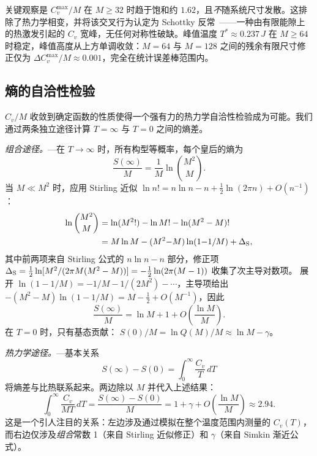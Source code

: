 \documentclass[aps, pre, reprint, amsmath, amssymb, superscriptaddress, floatfix]{revtex4-2}
\begin{document}
关键观察是 $C_v^{\max}/M$ 在 $M \ge 32$ 时趋于饱和约 $1.62$，且\emph{不}随系统尺寸发散。这排除了热力学相变，并将该交叉行为认定为 Schottky 反常~\cite{Binder1997}——一种由有限能隙上的热激发引起的 $C_v$ 宽峰，无任何对称性破缺。峰值温度 $T^* \approx 0.237\,J$ 在 $M \ge 64$ 时稳定，峰值高度从上方单调收敛：$M = 64$ 与 $M = 128$ 之间的残余有限尺寸修正仅为 $\Delta C_v^{\max}/M \approx 0.001$，完全在统计误差棒范围内。

\subsection{熵的自洽性检验}
\label{sec:entropy_check}

$C_v/M$ 收敛到确定函数的性质使得一个强有力的热力学自洽性检验成为可能。我们通过两条独立途径计算 $T = \infty$ 与 $T = 0$ 之间的熵差。

\textit{组合途径。}---在 $T \to \infty$ 时，所有构型等概率，每个皇后的熵为
\begin{equation}
  \frac{S(\infty)}{M}
  = \frac{1}{M}\ln\binom{M^2}{M}.
  \label{eq:Sinf_def}
\end{equation}
当 $M \ll M^2$ 时，应用 Stirling 近似
$\ln n! = n\ln n - n + \tfrac{1}{2}\ln(2\pi n) + O(n^{-1})$：
\begin{align}
  \ln\binom{M^2}{M}
  &= \ln(M^2!) - \ln M! - \ln(M^2 - M)! \notag\\
  &= M\ln M - (M^2{-}M)\ln(1{-}1/M)
  + \Delta_{\rm S},
  \label{eq:Sinf_stirling}
\end{align}
其中前两项来自 Stirling 公式的 $n\ln n - n$ 部分，修正项
$\Delta_{\rm S} = \tfrac{1}{2}\ln[M^2/(2\pi M(M^2-M))]
= -\tfrac{1}{2}\ln(2\pi(M-1))$ 收集了次主导对数项。
展开 $\ln(1 - 1/M) = -1/M - 1/(2M^2) - \cdots$，主导项给出 $-(M^2-M)\ln(1-1/M) = M - \tfrac{1}{2} + O(M^{-1})$，因此
\begin{equation}
  \frac{S(\infty)}{M}
  = \ln M + 1 + O\!\left(\frac{\ln M}{M}\right).
  \label{eq:Sinf}
\end{equation}
在 $T = 0$ 时，只有基态贡献：
$S(0)/M = \ln Q(M)/M \approx \ln M - \gamma$。

\textit{热力学途径。}---基本关系
\begin{equation}
  S(\infty) - S(0) = \int_0^\infty \frac{C_v}{T}\,dT
  \label{eq:thermo_int}
\end{equation}
将熵差与比热联系起来。两边除以 $M$ 并代入上述结果：
\begin{equation}
  \int_0^\infty \frac{C_v}{MT}\,dT
  = \frac{S(\infty) - S(0)}{M}
  = 1 + \gamma + O\!\left(\frac{\ln M}{M}\right)
  \approx 2.94.
  \label{eq:DS}
\end{equation}
这是一个引人注目的关系：左边涉及通过模拟在整个温度范围内测量的 $C_v(T)$，而右边仅涉及\emph{组合}常数 1（来自 Stirling 近似修正）和 $\gamma$（来自 Simkin 渐近公式）。
\end{document}
